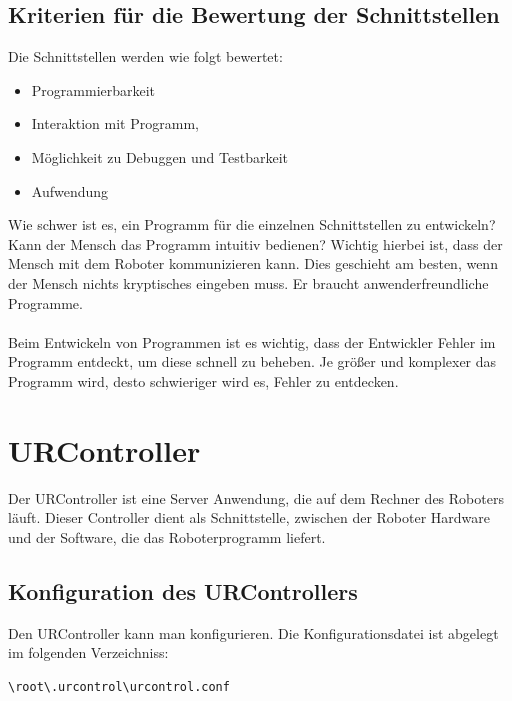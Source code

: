 \subsection{Kriterien für die Bewertung der Schnittstellen}
\label{sub:criterias_of_solutions_kon}

Die Schnittstellen werden wie folgt bewertet:

\begin{itemize}
\item Programmierbarkeit
\item Interaktion mit Programm,
\item Möglichkeit zu Debuggen und Testbarkeit
\item Aufwendung
\end{itemize}

Wie schwer ist es, ein Programm für die einzelnen Schnittstellen zu entwickeln?
Kann der Mensch das Programm intuitiv bedienen? Wichtig hierbei ist, dass der Mensch mit dem Roboter kommunizieren kann. Dies geschieht am besten, wenn der Mensch nichts kryptisches eingeben muss. Er braucht anwenderfreundliche Programme.
\\\\
Beim Entwickeln von Programmen ist es wichtig, dass der Entwickler Fehler im Programm entdeckt, um diese schnell zu beheben.
Je größer und komplexer das Programm wird, desto schwieriger wird es, Fehler zu entdecken. 

\section{URController}
\label{sec:ur_control_gru}

Der URController ist eine Server Anwendung, die auf dem Rechner des Roboters läuft. 
Dieser Controller dient als Schnittstelle, zwischen der Roboter Hardware und der Software, die das Roboterprogramm liefert. 

\subsection{Konfiguration des URControllers}
\label{urcontrol_rci_gru}

Den URController kann man konfigurieren. Die Konfigurationsdatei ist abgelegt im folgenden Verzeichniss:
\begin{lstlisting}
\root\.urcontrol\urcontrol.conf
\end{lstlisting}


